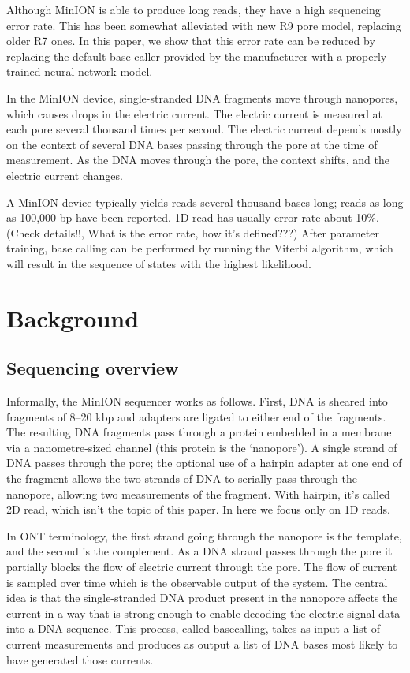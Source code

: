 \documentclass[times, utf8, seminar, numeric]{fer}
\begin{document}
Although MinION is able to produce long reads, they have a high sequencing error rate. This has been somewhat alleviated with new R9 pore model, replacing older R7 ones. In this paper, we show that this error rate can be reduced by replacing the default base caller provided by the manufacturer with a properly trained neural network model.

In the MinION device, single-stranded DNA fragments move through nanopores, which causes drops in the electric current. The electric current is measured at each pore several thousand times per second. The electric current depends mostly on the context of several DNA bases passing through the pore at the time of measurement. As the DNA moves through the pore, the context shifts, and the electric current changes.

A MinION device typically yields reads several thousand bases long; reads as long as 100,000 bp have been reported. 1D read has usually error rate about   10\%. (Check details!!, What is the error rate, how it's defined???) After parameter training, base calling can be performed by running the Viterbi algorithm, which will result in the sequence of states with the highest likelihood.

\chapter{Background}

\section{Sequencing overview}
Informally, the MinION sequencer works as follows. First, DNA is sheared into fragments of 8–20 kbp and adapters are ligated to either end of the fragments. The resulting DNA fragments pass through a protein embedded in a membrane via a nanometre-sized channel (this protein is the `nanopore'). A single strand of DNA passes through the pore; the optional use of a hairpin adapter at one end of the fragment allows the two strands of DNA to serially pass through the nanopore, allowing two measurements of the fragment. With hairpin, it's called 2D read, which isn't the topic of this paper. In here we focus only on 1D reads.

In ONT terminology, the first strand going through the nanopore is the template, and the second is the complement. As a DNA strand passes through the pore it partially blocks the flow of electric current through the pore. The flow of current is sampled over time which is the observable output of the system. The central idea is that the single-stranded DNA product present in the nanopore affects the current in a way that is strong enough to enable decoding the electric signal data into a DNA sequence. This process, called basecalling, takes as input a list of current measurements and produces as output a list of DNA bases most likely to have generated those currents.
\end{document}
